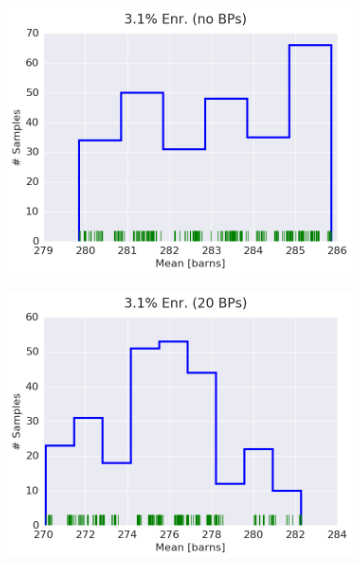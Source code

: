 \begin{figure}[h!]
\centering
\begin{subfigure}{0.5\textwidth}
  \centering
  \includegraphics[width=\linewidth]{figures/patterns/assm-3.1/hist-kde-rug/assm-31-fiss-2}
  \caption{}
  \label{fig:chap9-hist-assm-3.1-fiss}
\end{subfigure}%
\begin{subfigure}{0.5\textwidth}
  \centering
  \includegraphics[width=\linewidth]{figures/patterns/assm-3.1-20BPs/hist-kde-rug/assm-31-20BPs-fiss-2}
  \caption{}
  \label{fig:chap9-hist-assm-3.1-20BPs-fiss}
\end{subfigure}
\begin{subfigure}{0.5\textwidth}

\end{subfigure}
\end{figure}
